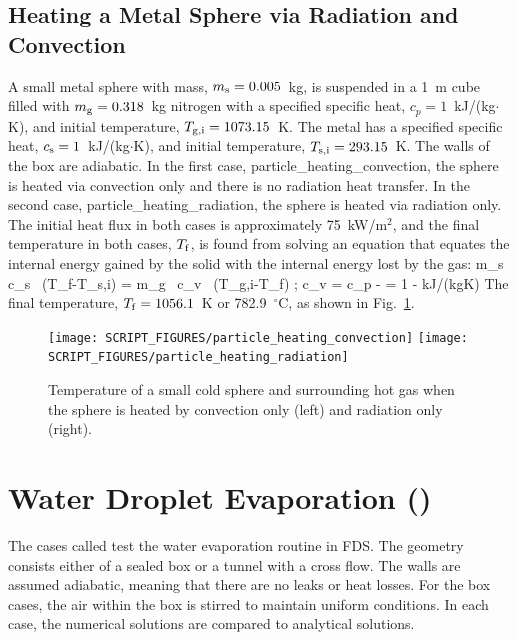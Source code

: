 \documentclass[11pt]{book}
\begin{document}
\subsection{Heating a Metal Sphere via Radiation and Convection}
\label{particle_heating_convection}
\label{particle_heating_radiation}

A small metal sphere with mass, $m_{\rm s}=0.005$~kg, is suspended in a 1~m cube filled with $m_{\rm g}=0.318$~kg nitrogen with a specified specific heat, $c_p=1$~kJ/(kg$\cdot$K), and initial temperature, $T_{\rm g,i}=1073.15$~K. The metal has a specified specific heat, $c_{\rm s}=1$~kJ/(kg$\cdot$K), and initial temperature, $T_{\rm s,i}=293.15$~K. The walls of the box are adiabatic. In the first case, {\ct particle\_heating\_convection}, the sphere is heated via convection only and there is no radiation heat transfer. In the second case, {\ct particle\_heating\_radiation}, the sphere is heated via radiation only. The initial heat flux in both cases is approximately 75~kW/m$^2$, and the final temperature in both cases, $T_{\rm f}$, is found from solving an equation that equates the internal energy gained by the solid with the internal energy lost by the gas:
\be
   m_{\rm s} \, c_{\rm s} \, (T_{\rm f}-T_{\rm s,i}) = m_{\rm g} \, c_{v} \, (T_{\rm g,i}-T_{\rm f})  \quad ; \quad  c_v = c_p -  = 1 -   \; \hbox{kJ/(kg}\cdot\hbox{K})
\ee
The final temperature, $T_{\rm f}=1056.1$~K or 782.9~$^\circ$C, as shown in Fig.~\ref{particle_heating_figs}.
\begin{figure}[ht]
\texttt{[image: SCRIPT\_FIGURES/particle\_heating\_convection]}
\texttt{[image: SCRIPT\_FIGURES/particle\_heating\_radiation]}
\caption[The {\ct particle\_heating} test cases]{Temperature of a small cold sphere and surrounding hot gas when the sphere is heated by convection only (left) and radiation only (right).}
\label{particle_heating_figs}
\end{figure}


\clearpage

\section{Water Droplet Evaporation (\texorpdfstring{{}}{water\_evaporation}) }
\label{water_evaporation}

The cases called  test the water evaporation routine in FDS. The geometry consists either of
a sealed box or a tunnel with a cross flow. The walls are assumed adiabatic, meaning that there are no leaks or heat losses.
For the box cases, the air within the box is stirred to maintain uniform conditions.
In each case, the numerical solutions are compared to analytical solutions.
\end{document}
